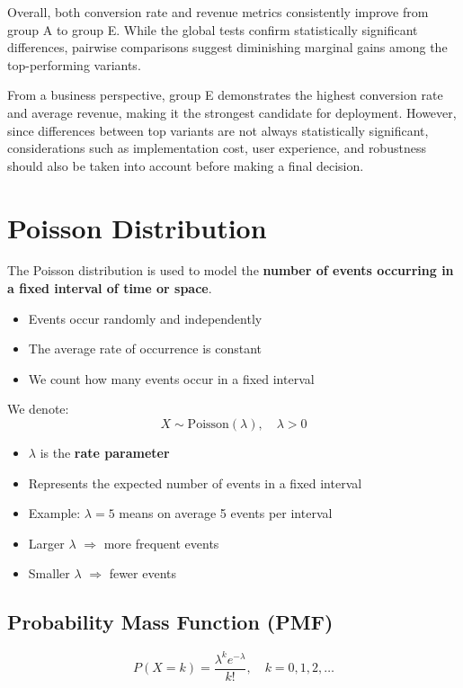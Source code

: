 \documentclass[10pt,a4paper]{article}
\begin{document}
Overall, both conversion rate and revenue metrics consistently improve from group A to group E. While the global tests confirm statistically significant differences, pairwise comparisons suggest diminishing marginal gains among the top-performing variants.

From a business perspective, group E demonstrates the highest conversion rate and average revenue, making it the strongest candidate for deployment. However, since differences between top variants are not always statistically significant, considerations such as implementation cost, user experience, and robustness should also be taken into account before making a final decision.


\section{Poisson Distribution}

The Poisson distribution is used to model the \textbf{number of events occurring in a fixed interval of time or space}.

\begin{itemize}
 \item Events occur randomly and independently
 \item The average rate of occurrence is constant
 \item We count how many events occur in a fixed interval
\end{itemize}

We denote:
\[
X \sim \text{Poisson}(\lambda), \quad \lambda > 0
\]

\begin{itemize}
 \item $\lambda$ is the \textbf{rate parameter}
 \item Represents the expected number of events in a fixed interval
 \item Example: $\lambda = 5$ means on average 5 events per interval
 \item Larger $\lambda$ $\Rightarrow$ more frequent events
 \item Smaller $\lambda$ $\Rightarrow$ fewer events
\end{itemize}


\subsection{Probability Mass Function (PMF)}

\[
P(X = k) = \frac{\lambda^k e^{-\lambda}}{k!}, \quad k = 0,1,2,\ldots
\]
\end{document}
